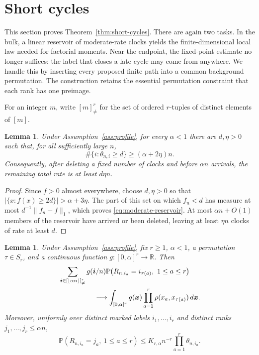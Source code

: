\documentclass[11pt]{article}
\newtheorem{lemma}[theorem]{Lemma}
\theoremstyle{remark}
\theoremstyle{plain}
\newcommand{\Pp}{\mathbb P}
\newcommand{\R}{\mathbb R}
\begin{document}
\section{Short cycles}\label{sec:short-cycles}

This section proves Theorem~\ref{thm:short-cycles}.  There are again two
tasks.  In the bulk, a linear reservoir of moderate-rate clocks yields the
finite-dimensional local law needed for factorial moments.  Near the
endpoint, the fixed-point estimate no longer suffices: the label that closes
a late cycle may come from anywhere.  We handle this by inserting every
proposed finite path into a common background permutation.  The construction
retains the essential permutation constraint that each rank has one
preimage.

For an integer $m$, write $[m]^r_{\ne}$ for the set of ordered $r$-tuples of
distinct elements of $[m]$.

\begin{lemma}\label{lem:moderate-reservoir}
Under Assumption~\ref{ass:profile}, for every $\alpha<1$ there are
$d,\eta>0$ such that, for all sufficiently large $n$,
\begin{equation}\label{eq:moderate-reservoir}
 \#\{i:\theta_{n,i}\ge d\}\ge(\alpha+2\eta)n.
\end{equation}
Consequently, after deleting a fixed number of clocks and before $\alpha n$
arrivals, the remaining total rate is at least $d\eta n$.
\end{lemma}

\begin{proof}
Since $f>0$ almost everywhere, choose $d,\eta>0$ so that
$|\{x:f(x)\ge2d\}|>\alpha+3\eta$.  The part of this set on which $f_n<d$ has
measure at most $d^{-1}\lVert f_n-f\rVert_1$, which proves
\eqref{eq:moderate-reservoir}.  At most $\alpha n+O(1)$ members of the
reservoir have arrived or been deleted, leaving at least $\eta n$ clocks of
rate at least $d$.
\end{proof}

\begin{lemma}\label{lem:cyclic-local}
Under Assumption~\ref{ass:profile}, fix $r\ge1$, $\alpha<1$, a permutation
$\tau\in S_r$, and a continuous function $g:[0,\alpha]^r\to\R$.  Then
\begin{align}
 &\sum_{\boldsymbol i\in[\lfloor\alpha n\rfloor]^r_{\ne}}
 g(\boldsymbol i/n)
 \Pp\bigl(R_{n,i_a}=i_{\tau(a)},\ 1\le a\le r\bigr)
 \label{eq:cyclic-local-limit}\\
 &\hspace{0.7in}\longrightarrow
 \int_{[0,\alpha]^r}g(\boldsymbol x)
 \prod_{a=1}^r\rho(x_a,x_{\tau(a)})\,d\boldsymbol x.
 \notag
\end{align}
Moreover, uniformly over distinct marked labels $i_1,\ldots,i_r$ and
distinct ranks $j_1,\ldots,j_r\le\alpha n$,
\begin{equation}\label{eq:weighted-bulk-cylinder}
 \Pp(R_{n,i_a}=j_a,\ 1\le a\le r)
 \le K_{r,\alpha}n^{-r}\prod_{a=1}^r\theta_{n,i_a}.
\end{equation}
\end{lemma}
\end{document}
